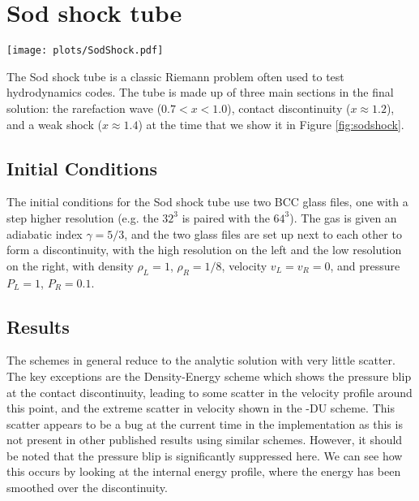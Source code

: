\section{Sod shock tube}
\label{sec:sodshock}

\begin{figure*}
    \centering
    \texttt{[image: plots/SodShock.pdf]}
    \vspace{-0.7cm}
    \caption{Individual quantities plotted against the analytic solution
    (purple dashed line) for the Sod shock tube. The horizontal axis
    shows the $x$ position of the particles. All particles are shown in blue
    with a sub-set shown in black. All panels are shown at the same
    time $t=0.2$.}
    \label{fig:sodshock}
\end{figure*}

The Sod shock tube is a classic Riemann problem often used to test
hydrodynamics codes. The tube is made up of three main sections in the final
solution: the rarefaction wave ($0.7 < x < 1.0$), contact discontinuity
($x\approx1.2$), and a weak shock ($x\approx1.4$) at the time that we show it
in Figure \ref{fig:sodshock}.

\subsection{Initial Conditions}

The initial conditions for the Sod shock tube use two BCC glass files, one
with a step higher resolution (e.g. the $32^3$ is paired with the $64^3$).
The gas is given an adiabatic index $\gamma = 5/3$, and the two glass files
are set up next to each other to form a discontinuity, with the high
resolution on the left and the low resolution on the right, with density
$\rho_L = 1$, $\rho_R = 1/8$, velocity $v_L = v_R = 0$, and pressure $P_L =
1$, $P_R = 0.1$.

\subsection{Results}

The schemes in general reduce to the analytic solution with very little scatter.
The key exceptions are the Density-Energy scheme which shows the pressure blip
at the contact discontinuity, leading to some scatter in the velocity profile around
this point, and the extreme scatter in velocity shown in the \anarchy{}-DU scheme.
This scatter appears to be a bug at the current time in the implementation as this
is not present in other published results using similar schemes. However, it should
be noted that the pressure blip is significantly suppressed here. We can see how this
occurs by looking at the internal energy profile, where the energy has been smoothed
over the discontinuity.

